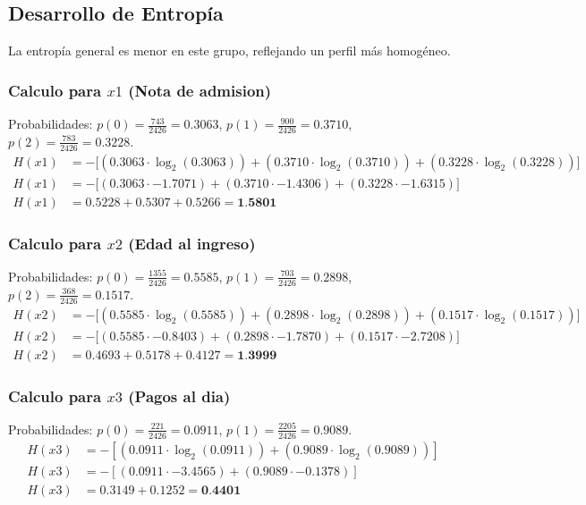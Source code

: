 \documentclass[12pt,a4paper]{article}
\begin{document}
\subsection{Desarrollo de Entropía}

La entropía general es menor en este grupo, reflejando un perfil más homogéneo.


\subsubsection{Calculo para $x1$ (Nota de admision)}
Probabilidades: $p(0) = \frac{743}{2426} = 0.3063$, $p(1) = \frac{900}{2426} = 0.3710$, $p(2) = \frac{783}{2426} = 0.3228$.
\begin{align*}
    H(x1) &= -\big[ (0.3063 \cdot \log_2(0.3063)) + (0.3710 \cdot \log_2(0.3710)) + (0.3228 \cdot \log_2(0.3228)) \big] \\
    H(x1) &= -\big[ (0.3063 \cdot -1.7071) + (0.3710 \cdot -1.4306) + (0.3228 \cdot -1.6315) \big] \\
    H(x1) &= 0.5228 + 0.5307 + 0.5266 = \textbf{1.5801}
\end{align*}

\subsubsection{Calculo para $x2$ (Edad al ingreso)}
Probabilidades: $p(0) = \frac{1355}{2426} = 0.5585$, $p(1) = \frac{703}{2426} = 0.2898$, $p(2) = \frac{368}{2426} = 0.1517$.
\begin{align*}
    H(x2) &= -\big[ (0.5585 \cdot \log_2(0.5585)) + (0.2898 \cdot \log_2(0.2898)) + (0.1517 \cdot \log_2(0.1517)) \big] \\
    H(x2) &= -\big[ (0.5585 \cdot -0.8403) + (0.2898 \cdot -1.7870) + (0.1517 \cdot -2.7208) \big] \\
    H(x2) &= 0.4693 + 0.5178 + 0.4127 = \textbf{1.3999}
\end{align*}

\subsubsection{Calculo para $x3$ (Pagos al dia)}
Probabilidades: $p(0) = \frac{221}{2426} = 0.0911$, $p(1) = \frac{2205}{2426} = 0.9089$.
\begin{align*}
    H(x3) &= -\left[ (0.0911 \cdot \log_2(0.0911)) + (0.9089 \cdot \log_2(0.9089)) \right] \\
    H(x3) &= -\left[ (0.0911 \cdot -3.4565) + (0.9089 \cdot -0.1378) \right] \\
    H(x3) &= 0.3149 + 0.1252 = \textbf{0.4401}
\end{align*}
\end{document}
